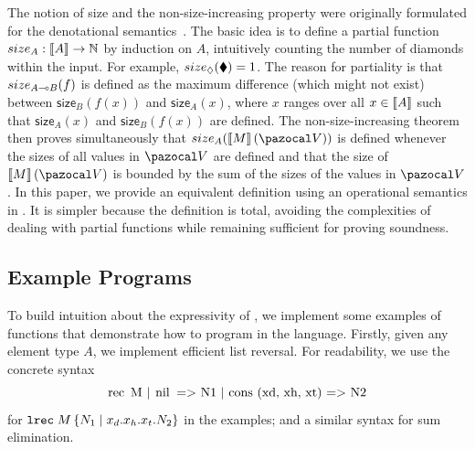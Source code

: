 

The notion of size and the non-size-increasing property were originally formulated for the denotational semantics~\cite{hofmannLinearTypesNonsizeincreasing1999}. The basic idea is to define a partial function $\mathsf{size}_A : \tpsem{A} \to \mathbb N$ by induction on $A$, intuitively counting the number of diamonds within the input. For example, $\mathsf{size}_{\tpdiam}(\blacklozenge) = 1$. The reason for partiality is that $\mathsf{size}_{\tparr{A}{B}}(f)$ is defined as the maximum difference (which might not exist) between $\mathsf{size}_B(f(x))$ and $\mathsf{size}_A(x)$, where $x$ ranges over all $x \in \llbracket A \rrbracket$ such that $\mathsf{size}_A(x)$ and $\mathsf{size}_B(f(x))$ are defined. The non-size-increasing theorem then proves simultaneously that $\mathsf{size}_A(\tmsem{M}{\env})$ is defined whenever the sizes of all values in $\env$ are defined and that the size of $\tmsem{M}{\env}$ is bounded by the sum of the sizes of the values in $\env$. In this paper, we provide an equivalent definition using an operational semantics in . It is simpler because the definition is total, avoiding the complexities of dealing with partial functions while remaining sufficient for proving soundness.


\subsection{Example Programs}
\label{sec:lfpl-examples}
\enlargethispage{2.4\baselineskip}

To build intuition about the expressivity of \lfpl, we implement some examples of functions that demonstrate how to program in the language. Firstly, given any element type $A$, we implement efficient list reversal. For readability, we use the concrete syntax
\[ \text{\lstinline{rec M | nil => N1 | cons (xd, xh, xt) => N2}} \]
for $\tmrec{M}{N_1}{x_d}{x_h}{x_t}{N_2}$ in the examples; and a similar syntax for sum elimination.

